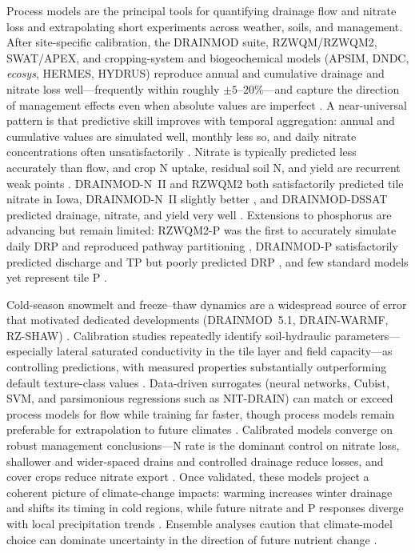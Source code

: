\documentclass[11pt]{article}
\begin{document}
Process models are the principal tools for quantifying drainage flow and
nitrate loss and extrapolating short experiments across weather, soils, and
management. After site-specific calibration, the DRAINMOD suite, RZWQM/RZWQM2,
SWAT/APEX, and cropping-system and biogeochemical models (APSIM, DNDC,
\textit{ecosys}, HERMES, HYDRUS) reproduce annual and cumulative drainage and
nitrate loss well---frequently within roughly $\pm5$--$20\%$---and capture the
direction of management effects even when absolute values are imperfect
\parencite{Youssef2018,Negm2014,Singh2020b,Dayyani2010,Ma2001}. A near-universal
pattern is that predictive skill improves with temporal aggregation: annual
and cumulative values are simulated well, monthly less so, and daily nitrate
concentrations often unsatisfactorily
\parencite{Liang2018,Ikenberry2017,Marjerison2016,Ojeda2018,Qi2025}. Nitrate is
typically predicted less accurately than flow, and crop N uptake, residual
soil N, and yield are recurrent weak points \parencite{Ma2007,Ahuja2007}.
DRAINMOD-N~II and RZWQM2 both satisfactorily predicted tile nitrate in Iowa,
DRAINMOD-N~II slightly better \parencite{Du2017,Qi2012}, and DRAINMOD-DSSAT
predicted drainage, nitrate, and yield very well
\parencite{Negm2014,Negm2017,Singh2022c}. Extensions to phosphorus are
advancing but remain limited: RZWQM2-P was the first to accurately simulate
daily DRP and reproduced pathway partitioning
\parencite{Sadhukhan2019,Grewal2025,BinShokrana2023b}, DRAINMOD-P satisfactorily
predicted discharge and TP but poorly predicted DRP
\parencite{Askar2021,Askar2025}, and few standard models yet represent tile P
\parencite{Radcliffe2015,Wang2020b}.

Cold-season snowmelt and freeze--thaw dynamics are a widespread source of error
that motivated dedicated developments (DRAINMOD~5.1, DRAIN-WARMF, RZ-SHAW)
\parencite{Wang2006c,Dayyani2010b,Li2024b}. Calibration studies repeatedly
identify soil-hydraulic parameters---especially lateral saturated conductivity
in the tile layer and field capacity---as controlling predictions, with
measured properties substantially outperforming default texture-class values
\parencite{Ma2007c,Ahuja2007,Malone2017}. Data-driven surrogates (neural
networks, Cubist, SVM, and parsimonious regressions such as NIT-DRAIN) can
match or exceed process models for flow while training far faster, though
process models remain preferable for extrapolation to future climates
\parencite{Sharma2003,Negm2016,Frederiksen2023,Chelil2022,Li2025}. Calibrated
models converge on robust management conclusions---N rate is the dominant
control on nitrate loss, shallower and wider-spaced drains and controlled
drainage reduce losses, and cover crops reduce nitrate export
\parencite{Moriasi2013,Fang2012,Malone2007c,Youssef2023}. Once validated,
these models project a coherent picture of climate-change impacts: warming
increases winter drainage and shifts its timing in cold regions, while future
nitrate and P responses diverge with local precipitation trends
\parencite{Li2025,Rasmussen2018,Jeantet2022,Haghnazari2020,Dialameh2025,Wang2021,Mehan2019,Adhikari2020}.
Ensemble analyses caution that climate-model choice can dominate uncertainty
in the direction of future nutrient change \parencite{Kujawa2020}.
\end{document}
